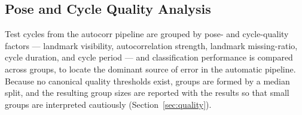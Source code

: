 \subsection{Pose and Cycle Quality Analysis}
\label{sec:abl-quality}
Test cycles from the autocorr pipeline are grouped by pose- and cycle-quality
factors --- landmark visibility, autocorrelation strength, landmark
missing-ratio, cycle duration, and cycle period --- and classification
performance is compared across groups, to locate the dominant source of error in
the automatic pipeline. Because no canonical quality thresholds exist, groups are
formed by a median split, and the resulting group sizes are reported with the
results so that small groups are interpreted cautiously
(Section~\ref{sec:quality}).

